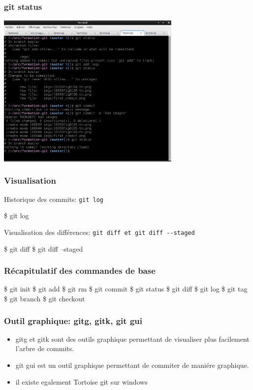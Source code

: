 \documentclass{beamer}
\begin{document}
  \begin{frame}
     \frametitle{git status}
     \begin{center}
       \includegraphics[width=9cm]{imgs/status.eps}
     \end{center}
  \end{frame}

\begin{frame}[fragile]\frametitle{Visualisation}
  Historique des commits: \verb|git log|

  \begin{semiverbatim}
  \$ \alert{git log}
  \end{semiverbatim}

  Visualisation des différences: \verb|git diff et git diff --staged|
  \begin{semiverbatim}
  \$ \alert{git diff}
  \$ \alert{git diff --staged}
  \end{semiverbatim}

\end{frame}

\begin{frame}[fragile]
  \frametitle{Récapitulatif des commandes de base}
  \begin{semiverbatim}
    \$ git init
    \$ git add
    \$ git rm
    \$ git commit
    \$ git status
    \$ git diff
    \$ git log
    \$ git tag
    \$ git branch
    \$ git checkout
  \end{semiverbatim}
\end{frame}

\begin{frame}
  \frametitle{Outil graphique: gitg, gitk, git gui}
  \begin{itemize}
  \item gitg et gitk sont des outils graphique permettant de visualiser plus facilement l'arbre de commits.
  \item git gui est un outil graphique permettant de commiter de maniére graphique.
  \item il existe egalement Tortoise git sur windows
  \end{itemize}
\end{frame}
\end{document}

